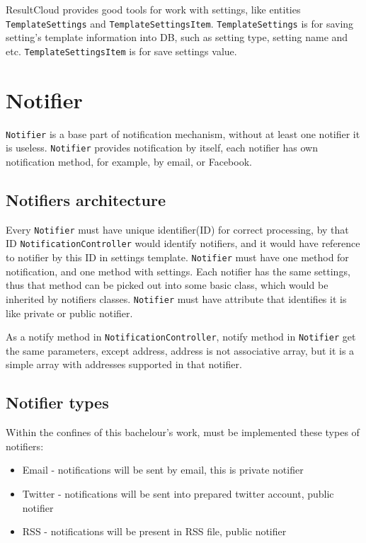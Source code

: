 ResultCloud provides good tools for work with settings, like entities \texttt{TemplateSettings} and \texttt{TemplateSettingsItem}. \texttt{TemplateSettings} is for saving setting's template information into DB, such as setting type, setting name and etc. \texttt{TemplateSettingsItem} is for save settings value.

\section{Notifier}

\texttt{Notifier} is a base part of notification mechanism, without at least one notifier it is useless. \texttt{Notifier} provides notification by itself, each notifier has own notification method, for example, by email, or Facebook.

\subsection{Notifiers architecture}

Every \texttt{Notifier} must have unique identifier(ID) for correct processing, by that ID \texttt{Notifica\-tion\-Controller} would identify notifiers, and it would have reference to notifier by this ID in settings template. \texttt{Notifier} must have one method for notification, and one method with settings. Each notifier has the same settings, thus that method can be picked out into some basic class, which would be inherited by notifiers classes. \texttt{Notifier} must have attribute that identifies it is like private or public notifier.

As a notify method in \texttt{NotificationController}, notify method in \texttt{Notifier} get the same parameters, except address, address is not associative array, but it is a simple array with addresses supported in that notifier. 

\subsection{Notifier types}
\label{subsec:notifiers}

Within the confines of this bachelour's work, must be implemented these types of notifiers:
\begin{itemize} 
\item Email - notifications will be sent by email, this is private notifier
\item Twitter - notifications will be sent into prepared twitter account, public notifier
\item RSS - notifications will be present in RSS file, public notifier
\end{itemize}

